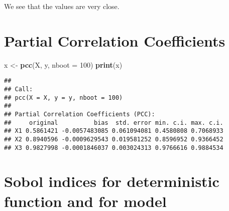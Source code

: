 \documentclass[
  11pt,
]{book}
\newenvironment{Shaded}{\begin{snugshade}}{\end{snugshade}}
\newcommand{\DataTypeTok}[1]{\textcolor[rgb]{0.13,0.29,0.53}{#1}}
\newcommand{\DecValTok}[1]{\textcolor[rgb]{0.00,0.00,0.81}{#1}}
\newcommand{\KeywordTok}[1]{\textcolor[rgb]{0.13,0.29,0.53}{\textbf{#1}}}
\newcommand{\NormalTok}[1]{#1}
\newcommand{\StringTok}[1]{\textcolor[rgb]{0.31,0.60,0.02}{#1}}
\begin{document}
We see that the values are very close.

\hypertarget{partial-correlation-coefficients}{%
\section{Partial Correlation Coefficients}\label{partial-correlation-coefficients}}

\begin{Shaded}
\begin{Highlighting}[]
\NormalTok{x <-}\StringTok{ }\KeywordTok{pcc}\NormalTok{(X, y, }\DataTypeTok{nboot =} \DecValTok{100}\NormalTok{)}
\KeywordTok{print}\NormalTok{(x)}
\end{Highlighting}
\end{Shaded}

\begin{verbatim}
## 
## Call:
## pcc(X = X, y = y, nboot = 100)
## 
## Partial Correlation Coefficients (PCC):
##     original          bias  std. error min. c.i. max. c.i.
## X1 0.5861421 -0.0057483085 0.061094081 0.4580808 0.7068933
## X2 0.8940596 -0.0009629543 0.019581252 0.8596952 0.9366452
## X3 0.9827998 -0.0001846037 0.003024313 0.9766616 0.9884534
\end{verbatim}

\hypertarget{sobol-indices-for-deterministic-function-and-for-model}{%
\section{Sobol indices for deterministic function and for model}\label{sobol-indices-for-deterministic-function-and-for-model}}
\end{document}
